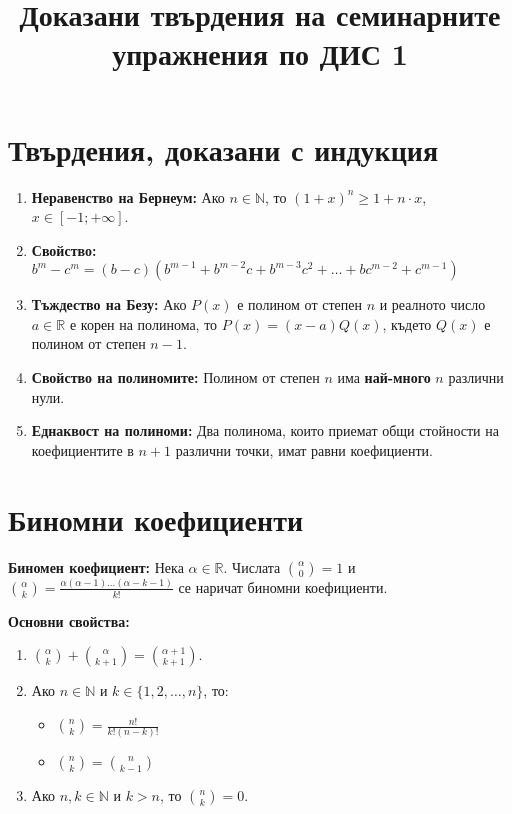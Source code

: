 \documentclass[11pt,oneside,a4paper]{article}
\begin{document}
\title{Доказани твърдения на семинарните упражнения по ДИС 1}
\date{}
\maketitle

\section*{Твърдения, доказани с индукция}

\begin{enumerate}
    \item \textbf{Неравенство  на Бернеум:}  
    Ако \(n \in \mathbb{N} \), то \((1 + x)^n \geq 1 + n \cdot x\), \(x \in [-1; +\infty]\).
    \item \textbf{Свойство:} 
    \(b^m - c^m = (b - c)(b^{m-1} + b^{m-2}c + b^{m-3}c^2 + \dots + bc^{m-2} + c^{m-1})\)
    \item \textbf{Тъждество на Безу:}  
    Ако \(P(x)\) е полином от степен \(n\) и реалното число \(a \in \mathbb{R}\) е корен на полинома, то \(P(x) = (x-a)Q(x)\), където \(Q(x)\) е полином от степен \(n-1\).
    \item \textbf{Свойство на полиномите:}  
    Полином от степен \(n\) има \textbf{най-много} \(n\) различни нули.
    \item \textbf{Еднаквост на полиноми:}  
    Два полинома, които приемат общи стойности на коефициентите в \(n+1\) различни точки, имат равни коефициенти.
\end{enumerate}

\section*{Биномни коефициенти}

\textbf{Биномен коефициент:}  
Нека \(\alpha \in \mathbb{R}\). Числата \(\binom{\alpha}{0} = 1\) и \(\binom{\alpha}{k} = \frac{\alpha(\alpha - 1)\dots(\alpha - k - 1)}{k!}\) се наричат биномни коефициенти.

\textbf{Основни свойства:} \vspace{-\baselineskip}
\begin{enumerate}[label=\textbf{(\alph*)}]
    \item \(\binom{\alpha}{k} + \binom{\alpha}{k+1} = \binom{\alpha + 1}{k + 1}\).
    \item Ако \(n \in \mathbb{N}\) и \(k \in \{1, 2, \dots, n\}\), то:
    \begin{itemize}
        \item \(\binom{n}{k} = \frac{n!}{k!(n-k)!}\)
        \item \(\binom{n}{k} = \binom{n}{k-1}\)
    \end{itemize}
    \item Ако \(n, k \in \mathbb{N}\) и \(k > n\), то \(\binom{n}{k} = 0\).
\end{enumerate}
\end{document}
